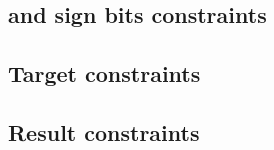 \subsection{\BITS{} and sign bits constraints}                     \label{wcp: target constraints}       
\subsection{Target constraints}                                    \label{wcp: target constraints}       
\subsection{Result constraints}                                    \label{wcp: result constraints}       
